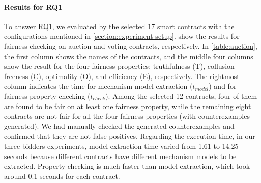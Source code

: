 \paragraph{Results for RQ1}
To answer RQ1, we evaluated \faircon by the selected $17$ smart contracts with the configurations
mentioned in \cref{section:experiment-setup}.
 show the results for fairness checking on auction and
voting contracts, respectively.
In \cref{table:auction}, the first column shows the names of the contracts, and the middle four
columns show the result for the four fairness properties: truthfulness (T), collusion-freeness (C),
optimality (O), and efficiency (E), respectively. The rightmost
column indicates the time for mechanism model extraction ($t_{model}$) and for fairness property checking ($t_{check}$). Among the selected 12 contracts, four of them are found to be fair on at least one fairness property, while the remaining eight contracts are not fair for all the four fairness properties (with counterexamples generated). We had manually checked the generated counterexamples and confirmed that they are not false positives. Regarding the execution time, in our three-bidders experiments, model extraction time varied from 1.61 to 14.25 seconds because different contracts have different mechanism models to be extracted. Property checking is much faster than model extraction, which took around 0.1 seconds for each contract.


